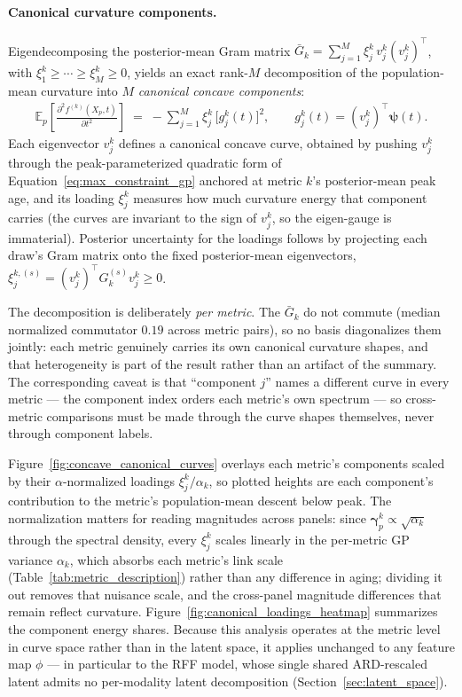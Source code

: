 \paragraph{Canonical curvature components.}
Eigendecomposing the posterior-mean Gram matrix $\bar G_k = \sum_{j=1}^M \xi^k_j\, v^k_j (v^k_j)^\top$, with $\xi^k_1 \ge \cdots \ge \xi^k_M \ge 0$, yields an exact rank-$M$ decomposition of the population-mean curvature into $M$ \emph{canonical concave components}:
\begin{align}
\label{eq:canonical_decomp}
  \mathbb{E}_p\!\left[\frac{\partial^2 f^{(k)}(X_p,t)}{\partial t^2}\right] \;=\; -\sum_{j=1}^M \xi^k_j \, \bigl[g^k_j(t)\bigr]^2, \qquad g^k_j(t) = (v^k_j)^\top \boldsymbol\psi(t).
\end{align}
Each eigenvector $v^k_j$ defines a canonical concave curve, obtained by pushing $v^k_j$ through the peak-parameterized quadratic form of Equation~\ref{eq:max_constraint_gp} anchored at metric $k$'s posterior-mean peak age, and its loading $\xi^k_j$ measures how much curvature energy that component carries (the curves are invariant to the sign of $v^k_j$, so the eigen-gauge is immaterial).  Posterior uncertainty for the loadings follows by projecting each draw's Gram matrix onto the fixed posterior-mean eigenvectors, $\xi^{k,(s)}_j = (v^k_j)^\top G^{(s)}_k v^k_j \ge 0$.

The decomposition is deliberately \emph{per metric}.  The $\bar G_k$ do not commute (median normalized commutator $0.19$ across metric pairs), so no basis diagonalizes them jointly: each metric genuinely carries its own canonical curvature shapes, and that heterogeneity is part of the result rather than an artifact of the summary.  The corresponding caveat is that ``component $j$'' names a different curve in every metric --- the component index orders each metric's own spectrum --- so cross-metric comparisons must be made through the curve shapes themselves, never through component labels.

Figure~\ref{fig:concave_canonical_curves} overlays each metric's components scaled by their $\alpha$-normalized loadings $\xi^k_j / \alpha_k$, so plotted heights are each component's contribution to the metric's population-mean descent below peak.  The normalization matters for reading magnitudes across panels: since $\boldsymbol\gamma^k_p \propto \sqrt{\alpha_k}$ through the spectral density, every $\xi^k_j$ scales linearly in the per-metric GP variance $\alpha_k$, which absorbs each metric's link scale (Table~\ref{tab:metric_description}) rather than any difference in aging; dividing it out removes that nuisance scale, and the cross-panel magnitude differences that remain reflect curvature.  Figure~\ref{fig:canonical_loadings_heatmap} summarizes the component energy shares.  Because this analysis operates at the metric level in curve space rather than in the latent space, it applies unchanged to any feature map $\phi$ --- in particular to the RFF model, whose single shared ARD-rescaled latent admits no per-modality latent decomposition (Section~\ref{sec:latent_space}).

